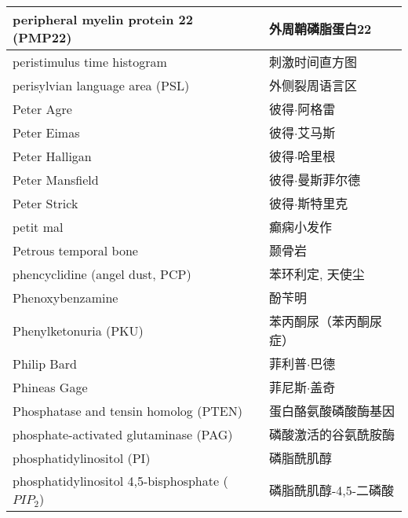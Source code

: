 \begin{longtable}{lll}
	\midrule
	peripheral myelin protein 22  (PMP22)   && 外周鞘磷脂蛋白22   \\
	
	\midrule
	peristimulus time histogram   && 刺激时间直方图   \\
	
	\midrule
	perisylvian language area (PSL)   && 外侧裂周语言区   \\
	
	\midrule
	Peter Agre     && 彼得$\cdot$阿格雷   \\
	
	\midrule
	Peter Eimas     && 彼得$\cdot$艾马斯   \\
	
	\midrule
	Peter Halligan     && 彼得$\cdot$哈里根   \\
	
	\midrule
	Peter Mansfield     && 彼得$\cdot$曼斯菲尔德   \\
	
	\midrule
	Peter Strick     && 彼得$\cdot$斯特里克   \\
	
	\midrule
	petit mal     && 癫痫小发作   \\
	
	\midrule
	Petrous temporal bone     && 颞骨岩   \\
	
	\midrule
	phencyclidine  (angel dust, PCP)  &&  苯环利定, 天使尘   \\
	
	\midrule
	Phenoxybenzamine  &&  酚苄明   \\
	
	\midrule
	Phenylketonuria (PKU)    &&  苯丙酮尿（苯丙酮尿症）   \\
	
	\midrule
	Philip Bard     && 菲利普$\cdot$巴德   \\
	
	\midrule
	Phineas Gage     && 菲尼斯$\cdot$盖奇   \\
	
	\midrule
	Phosphatase and tensin homolog (PTEN)    && 蛋白酪氨酸磷酸酶基因   \\
	
	\midrule
	phosphate-activated glutaminase (PAG)   && 磷酸激活的谷氨酰胺酶   \\
	
	\midrule
	phosphatidylinositol (PI)    && 磷脂酰肌醇   \\
	
	\midrule
	\makecell[l]{phosphatidylinositol \\ 4,5-bisphosphate ($ PIP_2 $)}    && 磷脂酰肌醇-4,5-二磷酸   \\
	

\end{longtable}
